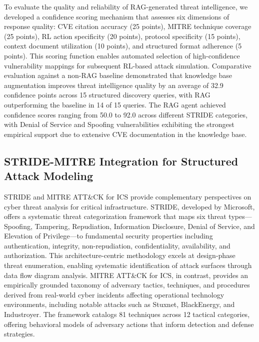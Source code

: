 To evaluate the quality and reliability of RAG-generated threat intelligence, we developed a confidence scoring mechanism that assesses six dimensions of response quality: CVE citation accuracy (25 points), MITRE technique coverage (25 points), RL action specificity (20 points), protocol specificity (15 points), context document utilization (10 points), and structured format adherence (5 points). This scoring function enables automated selection of high-confidence vulnerability mappings for subsequent RL-based attack simulation. Comparative evaluation against a non-RAG baseline demonstrated that knowledge base augmentation improves threat intelligence quality by an average of 32.9 confidence points across 15 structured discovery queries, with RAG outperforming the baseline in 14 of 15 queries. The RAG agent achieved confidence scores ranging from 50.0 to 92.0 across different STRIDE categories, with Denial of Service and Spoofing vulnerabilities exhibiting the strongest empirical support due to extensive CVE documentation in the knowledge base.

\subsection{STRIDE-MITRE Integration for Structured Attack Modeling}

STRIDE and MITRE ATT\&CK for ICS provide complementary perspectives on cyber threat analysis for critical infrastructure. STRIDE, developed by Microsoft, offers a systematic threat categorization framework that maps six threat types—Spoofing, Tampering, Repudiation, Information Disclosure, Denial of Service, and Elevation of Privilege—to fundamental security properties including authentication, integrity, non-repudiation, confidentiality, availability, and authorization. This architecture-centric methodology excels at design-phase threat enumeration, enabling systematic identification of attack surfaces through data flow diagram analysis. MITRE ATT\&CK for ICS, in contrast, provides an empirically grounded taxonomy of adversary tactics, techniques, and procedures derived from real-world cyber incidents affecting operational technology environments, including notable attacks such as Stuxnet, BlackEnergy, and Industroyer. The framework catalogs 81 techniques across 12 tactical categories, offering behavioral models of adversary actions that inform detection and defense strategies.

